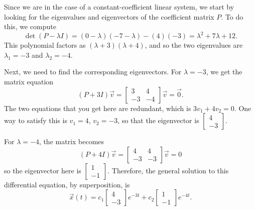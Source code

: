 \begin{exampleSol}
Since we are in the case of a constant-coefficient linear system, we start by looking for the eigenvalues and eigenvectors of the coefficient matrix $P$. To do this, we compute
\begin{equation*}
\det(P - \lambda I) = (0-\lambda)(-7-\lambda) - (4)(-3) = \lambda^2 + 7\lambda + 12.
\end{equation*}
This polynomial factors as $(\lambda + 3)(\lambda + 4)$, and so the two eigenvalues are $\lambda_1 = -3$ and $\lambda_2 = -4$. 

Next, we need to find the corresponding eigenvectors. For $\lambda = -3$, we get the matrix equation
\begin{equation*}
(P + 3I)\vec{v} = \begin{bmatrix} 3 & 4 \\ -3 & -4 \end{bmatrix} \vec{v} = \vec{0}. 
\end{equation*}
The two equations that you get here are redundant, which is $3v_1 + 4v_2 = 0$. One way to satisfy this is $v_1 = 4$, $v_2 = -3$, so that the eigenvector is $\left[\begin{smallmatrix} 4 \\ -3 \end{smallmatrix} \right]$. 

For $\lambda = -4$, the matrix becomes
\begin{equation*}
(P + 4I)\vec{v} = \begin{bmatrix} 4 & 4 \\ -3 & -3 \end{bmatrix}\vec{v} = 0
\end{equation*}
so the eigenvector here is $\left[ \begin{smallmatrix} 1 \\ -1 \end{smallmatrix} \right]$. Therefore, the general solution to this differential equation, by superposition, is
\begin{equation*}
\vec{x}(t) = c_1 \begin{bmatrix} 4 \\ -3 \end{bmatrix}e^{-3t} + c_2 \begin{bmatrix} 1 \\ -1 \end{bmatrix}e^{-4t}.
\end{equation*}


\end{exampleSol}
